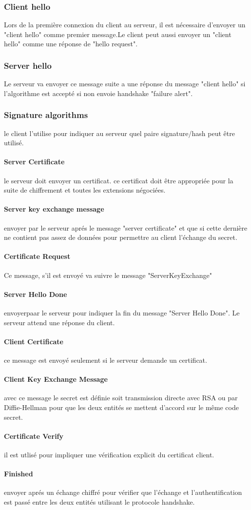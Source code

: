 \subsubsection {Client hello}
Lors de la première connexion du client au serveur, il est nécessaire d'envoyer un "client hello" comme premier message.Le client peut aussi envoyer un "client hello" comme une réponse de "hello request".
\subsubsection {Server hello}
Le serveur va envoyer ce message suite a une réponse du message "client hello" si l'algorithme est accepté si non envoie handshake "failure alert".
\subsubsection {Signature algorithms}
le client l'utilise pour indiquer au serveur quel paire signature/hash peut \^etre utilisé.
\paragraph{Server Certificate}
le serveur doit envoyer un certificat.
ce certificat doit être appropriée pour  la suite de chiffrement et toutes les extensions négociées.
\paragraph{Server key exchange message}
envoyer par le serveur aprés le message "server certificate" et que si cette dernière ne contient pas assez de données pour permettre au client l'échange du secret.
\paragraph{Certificate Request}
Ce message, s'il est envoyé va suivre le message "ServerKeyExchange"
\paragraph{Server Hello Done}
envoyerpaar le serveur pour indiquer la fin du message "Server Hello Done". Le serveur attend une réponse du client.
\paragraph{Client Certificate}
ce message est envoyé seulement si le serveur demande un certificat.
\paragraph{Client Key Exchange Message}
avec ce message le secret est définie soit transmission directe avec RSA ou par Diffie-Hellman pour que les deux entités se mettent d'accord sur le même code secret.
\paragraph{Certificate Verify}
il est utlisé pour impliquer une vérification explicit du certificat client.
\paragraph{Finished}
envoyer aprés un échange chiffré pour vérifier que l'échange et l'authentification est passé entre les deux entités utilisant le protocole handshake.

